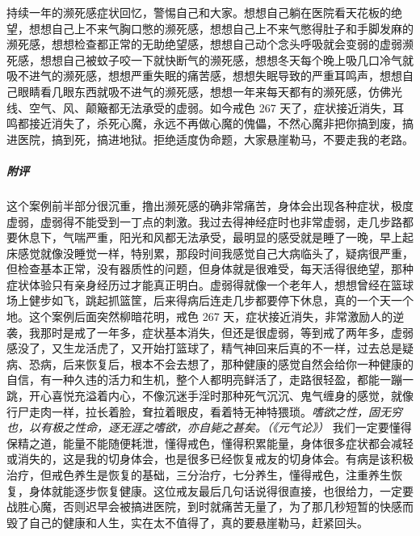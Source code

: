 \begin{case}
    持续一年的濒死感症状回忆，警惕自己和大家。想想自己躺在医院看天花板的绝望，想想自己上不来气胸口憋的濒死感，想想自己上不来气憋得肚子和手脚发麻的濒死感，想想检查都正常的无助绝望感，想想自己动个念头呼吸就会变弱的虚弱濒死感，想想自己被蚊子咬一下就快断气的濒死感，想想冬天每个晚上吸几口冷气就吸不进气的濒死感，想想严重失眠的痛苦感，想想失眠导致的严重耳鸣声，想想自己眼睛看几眼东西就吸不进气的濒死感，想想一年来每天都有的濒死感，仿佛光线、空气、风、颠簸都无法承受的虚弱。如今戒色 267 天了，症状接近消失，耳鸣都接近消失了，杀死心魔，永远不再做心魔的傀儡，不然心魔非把你搞到废，搞进医院，搞到死，搞进地狱。拒绝适度伪命题，大家悬崖勒马，不要走我的老路。
    \subparagraph{附评} 这个案例前半部分很沉重，撸出濒死感的确非常痛苦，身体会出现各种症状，极度虚弱，虚弱得不能受到一丁点的刺激。我过去得神经症时也非常虚弱，走几步路都要休息下，气喘严重，阳光和风都无法承受，最明显的感受就是睡了一晚，早上起床感觉就像没睡觉一样，特别累，那段时间我感觉自己大病临头了，疑病很严重，但检查基本正常，没有器质性的问题，但身体就是很难受，每天活得很绝望，那种症状体验只有亲身经历过才能真正明白。虚弱得就像一个老年人，想想曾经在篮球场上健步如飞，跳起抓篮筐，后来得病后连走几步都要停下休息，真的一个天一个地。这个案例后面突然柳暗花明，戒色 267 天，症状接近消失，非常激励人的逆袭，我那时是戒了一年多，症状基本消失，但还是很虚弱，等到戒了两年多，虚弱感没了，又生龙活虎了，又开始打篮球了，精气神回来后真的不一样，过去总是疑病、恐病，后来恢复后，根本不会去想了，那种健康的感觉自然会给你一种健康的自信，有一种久违的活力和生机，整个人都明亮鲜活了，走路很轻盈，都能一蹦一跳，开心喜悦充溢着内心，不像沉迷手淫时那种死气沉沉、鬼气缠身的感觉，就像行尸走肉一样，拉长着脸，耷拉着眼皮，看着特无神特猥琐。\textit{嗜欲之性，固无穷也，以有极之性命，逐无涯之嗜欲，亦自毙之甚矣。（《元气论》）} 我们一定要懂得保精之道，能量不能随便耗泄，懂得戒色，懂得积累能量，身体很多症状都会减轻或消失的，这是我的切身体会，也是很多已经恢复戒友的切身体会。有病是该积极治疗，但戒色养生是恢复的基础，三分治疗，七分养生，懂得戒色，注重养生恢复，身体就能逐步恢复健康。这位戒友最后几句话说得很直接，也很给力，一定要战胜心魔，否则迟早会被搞进医院，到时就痛苦无量了，为了那几秒短暂的快感而毁了自己的健康和人生，实在太不值得了，真的要悬崖勒马，赶紧回头。
\end{case}

